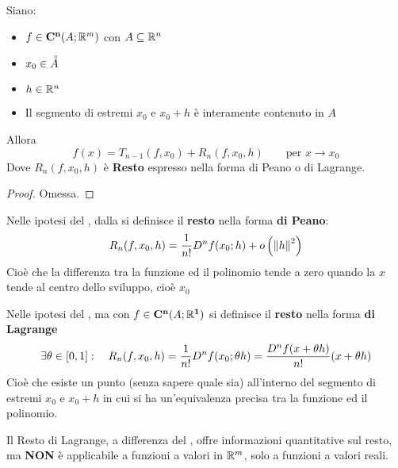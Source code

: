 \begin{theorem}[di Taylor]
	\label{teo:taylor}
	Siano:
	\begin{itemize}[noitemsep]
		\item $f \in \mathbf{C^{n}}(A;\mathbb{R}^m)$ con $A \subseteq \mathbb{R}^n$
		\item $x_0 \in \accentset{\circ}{A}$
		\item $h \in \mathbb{R}^n$
		\item Il segmento di estremi $x_0$ e $x_0 + h$ è interamente contenuto in $A$
	\end{itemize}
	Allora
	\[f(x) = T_{n-1}(f, x_0) + R_n(f, x_0, h) \qquad \text{per } x \to x_0\]
	Dove $R_n(f, x_0, h)$ è \textbf{Resto} espresso nella forma di Peano o di Lagrange.
	\begin{proof}
		Omessa.
	\end{proof}
\end{theorem}

\begin{definition}
	\label{def:resto_peano}
	Nelle ipotesi del , dalla  si definisce il \textbf{resto} nella forma \textbf{di Peano}:
	\[R_n(f, x_0, h) = \frac{1}{n!} D^nf(x_0; h) + o\left( \left\|h\right\|^2 \right)\]
	Cioè che la differenza tra la funzione ed il polinomio tende a zero quando la $x$ tende al centro dello sviluppo, cioè $x_0$
\end{definition}

\begin{definition}
	Nelle ipotesi del , ma con $f \in \mathbf{C^{n}}(A;\mathbb{R}^{\boldsymbol{1}})$ si definisce il \textbf{resto} nella forma \textbf{di Lagrange}
	\[\exists \theta \in \left[0,1\right]: \quad R_n(f, x_0, h) = \frac{1}{n!} D^nf(x_0; \theta h) = \frac{D^n f(x + \theta h)}{n!} (x + \theta h)\]
	Cioè che esiste un punto (senza sapere quale sia) all'interno del segmento di estremi $x_0$ e $x_0 + h$ in cui si ha un'equivalenza precisa tra la funzione ed il polinomio.
\end{definition}
\begin{observation}
	\label{obs:resto_lagr_Rn}
	Il Resto di Lagrange, a differenza del , offre informazioni quantitative sul resto, ma \textbf{NON} è applicabile a funzioni a valori in $\mathbb{R}^m$, solo a funzioni a valori reali.
\end{observation}
\color{black}

